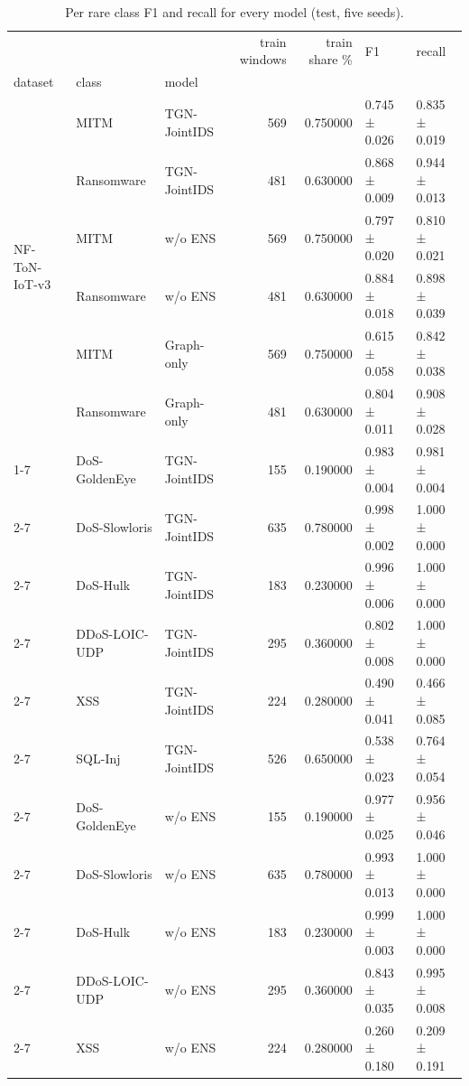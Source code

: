 \begin{table}
\caption{Per rare class F1 and recall for every model (test, five seeds).}
\label{tab:table_rare_per_class}
\begin{tabular}{lllrrll}
\toprule
 &  &  & train windows & train share \% & F1 & recall \\
dataset & class & model &  &  &  &  \\
\midrule
\multirow[t]{6}{*}{NF-ToN-IoT-v3} & MITM & TGN-JointIDS & 569 & 0.750000 & 0.745 ± 0.026 & 0.835 ± 0.019 \\
\cline{2-7}
 & Ransomware & TGN-JointIDS & 481 & 0.630000 & 0.868 ± 0.009 & 0.944 ± 0.013 \\
\cline{2-7}
 & MITM & w/o ENS & 569 & 0.750000 & 0.797 ± 0.020 & 0.810 ± 0.021 \\
\cline{2-7}
 & Ransomware & w/o ENS & 481 & 0.630000 & 0.884 ± 0.018 & 0.898 ± 0.039 \\
\cline{2-7}
 & MITM & Graph-only & 569 & 0.750000 & 0.615 ± 0.058 & 0.842 ± 0.038 \\
\cline{2-7}
 & Ransomware & Graph-only & 481 & 0.630000 & 0.804 ± 0.011 & 0.908 ± 0.028 \\
\cline{1-7} \cline{2-7}
\multirow[t]{18}{*}{NF-CICIDS2018-v3} & DoS-GoldenEye & TGN-JointIDS & 155 & 0.190000 & 0.983 ± 0.004 & 0.981 ± 0.004 \\
\cline{2-7}
 & DoS-Slowloris & TGN-JointIDS & 635 & 0.780000 & 0.998 ± 0.002 & 1.000 ± 0.000 \\
\cline{2-7}
 & DoS-Hulk & TGN-JointIDS & 183 & 0.230000 & 0.996 ± 0.006 & 1.000 ± 0.000 \\
\cline{2-7}
 & DDoS-LOIC-UDP & TGN-JointIDS & 295 & 0.360000 & 0.802 ± 0.008 & 1.000 ± 0.000 \\
\cline{2-7}
 & XSS & TGN-JointIDS & 224 & 0.280000 & 0.490 ± 0.041 & 0.466 ± 0.085 \\
\cline{2-7}
 & SQL-Inj & TGN-JointIDS & 526 & 0.650000 & 0.538 ± 0.023 & 0.764 ± 0.054 \\
\cline{2-7}
 & DoS-GoldenEye & w/o ENS & 155 & 0.190000 & 0.977 ± 0.025 & 0.956 ± 0.046 \\
\cline{2-7}
 & DoS-Slowloris & w/o ENS & 635 & 0.780000 & 0.993 ± 0.013 & 1.000 ± 0.000 \\
\cline{2-7}
 & DoS-Hulk & w/o ENS & 183 & 0.230000 & 0.999 ± 0.003 & 1.000 ± 0.000 \\
\cline{2-7}
 & DDoS-LOIC-UDP & w/o ENS & 295 & 0.360000 & 0.843 ± 0.035 & 0.995 ± 0.008 \\
\cline{2-7}
 & XSS & w/o ENS & 224 & 0.280000 & 0.260 ± 0.180 & 0.209 ± 0.191 \\

\end{tabular}
\end{table}
